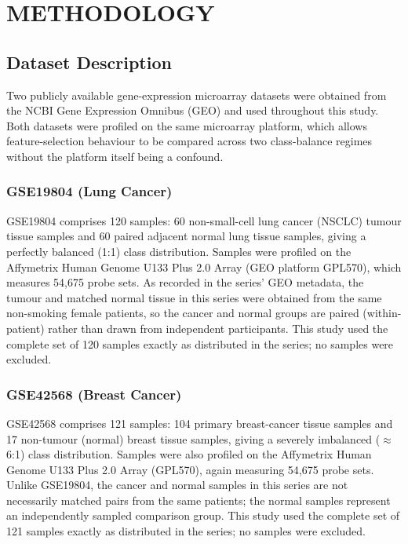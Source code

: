 \chapter{METHODOLOGY}

\section{Dataset Description}

Two publicly available gene-expression microarray datasets were obtained from the NCBI Gene Expression Omnibus (GEO) and used throughout this study. Both datasets were profiled on the same microarray platform, which allows feature-selection behaviour to be compared across two class-balance regimes without the platform itself being a confound.

\subsection{GSE19804 (Lung Cancer)}

GSE19804 comprises 120 samples: 60 non-small-cell lung cancer (NSCLC) tumour tissue samples and 60 paired adjacent normal lung tissue samples, giving a perfectly balanced (1:1) class distribution. Samples were profiled on the Affymetrix Human Genome U133 Plus 2.0 Array (GEO platform GPL570), which measures 54,675 probe sets. As recorded in the series' GEO metadata, the tumour and matched normal tissue in this series were obtained from the same non-smoking female patients, so the cancer and normal groups are paired (within-patient) rather than drawn from independent participants. This study used the complete set of 120 samples exactly as distributed in the series; no samples were excluded.

\subsection{GSE42568 (Breast Cancer)}

GSE42568 comprises 121 samples: 104 primary breast-cancer tissue samples and 17 non-tumour (normal) breast tissue samples, giving a severely imbalanced ($\approx$6:1) class distribution. Samples were also profiled on the Affymetrix Human Genome U133 Plus 2.0 Array (GPL570), again measuring 54,675 probe sets. Unlike GSE19804, the cancer and normal samples in this series are not necessarily matched pairs from the same patients; the normal samples represent an independently sampled comparison group. This study used the complete set of 121 samples exactly as distributed in the series; no samples were excluded.

